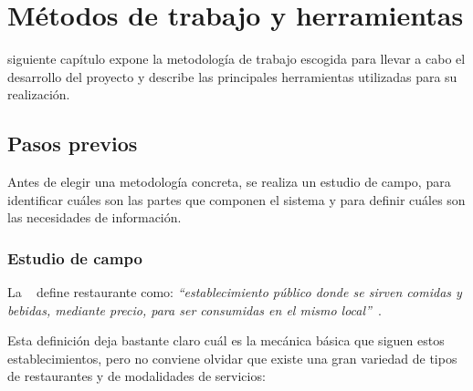 
\chapter{Métodos de trabajo y herramientas}
\label{chap:methods}
 siguiente capítulo expone la metodología de trabajo escogida para
llevar a cabo el desarrollo del proyecto y describe las principales 
herramientas utilizadas para su realización.

\section{Pasos previos}
Antes de elegir una metodología concreta, se realiza un estudio de campo, para 
identificar cuáles son las partes que componen el sistema y para definir
cuáles son las necesidades de información.

  \subsection{Estudio de campo}
  \label{sec:fieldStudy}
La ~\cite{bib:rae} define restaurante como: \emph{``establecimiento público 
donde se sirven comidas y bebidas, mediante precio, para ser consumidas en el
mismo local''}~\cite{bib:rae}.

Esta definición deja bastante claro cuál es la mecánica básica que siguen 
estos establecimientos, pero no conviene olvidar que existe una gran
variedad de tipos de restaurantes y de modalidades de servicios:

